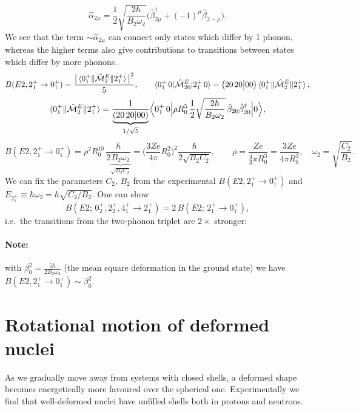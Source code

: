 \documentclass[11pt,a4paper]{article}
\newcommand{\op}[1]{\hat{#1}}
\begin{document}
\[
\op\alpha_{2\mu}=\frac12\sqrt{\frac{2\hbar}{B_2\omega_2}}\Big(\op\beta^\dagger_{2\mu}+(-1)^\mu\op\beta_{2-\mu}\Big).
\]
We see that the term $\sim\op\alpha_{2\mu}$ can connect only states which differ by 1 phonon, whereas the higher terms also give contributions to transitions between states which differ by more phonons.
\[
B(E2,2^+_1\to0^+_1)=\frac{\big|\braket{0^+_1\|\op{\mathcal M}^E_2\|2^+_1}\big|^2}{5},
\qquad
\braket{0^+_1\,0|\op{\mathcal M}^E_{20}|2^+_1\,0}=\big(20\,20\big|00\big)\braket{0^+_1\|\op{\mathcal M}^E_2\|2^+_1},
\]
\[
\braket{0^+_1\|\op{\mathcal M}^E_2\|2^+_1}=\frac{1}{\underbrace{(20\,20|00)}_{1/\sqrt5}}\Big\langle0^+_1\,0\Big|\rho R_0^5\,\frac12\sqrt{\frac{2\hbar}{B_2\omega_2}}\,\op\beta_{20}\op\beta^\dagger_{20}\Big|0\Big\rangle ,
\]
\[
B(E2,2^+_1\to0^+_1)=\rho^2R_0^{10}\,\frac{\hbar}{2\underbrace{B_2\omega_2}_{\sqrt{B_2C_2}}}
=\Big(\frac{3Ze}{4\pi}R_0^2\Big)^2\frac{\hbar}{2\sqrt{B_2C_2}},
\qquad \rho=\frac{Ze}{\frac43\pi R_0^3}=\frac{3Ze}{4\pi R_0^3},\quad \omega_2=\sqrt{\frac{C_2}{B_2}} .
\]
We can fix the parameters $C_2$, $B_2$ from the experimental $B(E2,2^+_1\to0^+_1)$ and $E_{2^+_1}\equiv\hbar\omega_2=\hbar\sqrt{C_2/B_2}$.
One can show
\[
\boxed{B(E2;\,0^+_2,2^+_2,4^+_1\to2^+_1)=2\,B(E2;\,2^+_1\to0^+_1)},
\]
i.e.\ the transitions from the two-phonon triplet are $2\times$ stronger:
\begin{center}
\end{center}
\paragraph{Note:} with $\beta_0^2=\frac{5\hbar}{2B_2\omega_2}$ (the mean square deformation in the ground state) we have $B(E2,2^+_1\to0^+_1)\sim\beta_0^2$.

\section{Rotational motion of deformed nuclei}
\label{sec:rot}
As we gradually move away from systems with closed shells, a deformed shape becomes energetically more favoured over the spherical one. Experimentally we find that well-deformed nuclei have unfilled shells both in protons and neutrons.
\end{document}
